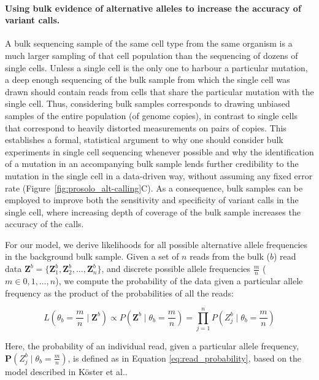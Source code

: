 \documentclass[12pt,inline]{wlscirep}
\newcommand{\Prob}{{\mathbf{P}}}
\begin{document}
\paragraph{Using bulk evidence of alternative alleles to increase the accuracy of variant calls.}
A bulk sequencing sample of the same cell type from the same organism is a much larger sampling of that cell population than the sequencing of dozens of single cells.
Unless a single cell is the only one to harbour a particular mutation, a deep enough sequencing of the bulk sample from which the single cell was drawn should contain reads from cells that share the particular mutation with the single cell.
Thus, considering bulk samples corresponds to drawing unbiased samples of the entire population (of genome copies), in contrast to single cells that correspond to heavily distorted measurements on pairs of copies.
This establishes a formal, statistical argument to why one should consider bulk experiments in single cell sequencing whenever possible and why the identification of a mutation in an accompanying bulk sample lends further credibility to the mutation in the single cell in a data-driven way, without assuming any fixed error rate (Figure~\ref{fig:prosolo_alt-calling}C).
As a consequence, bulk samples can be employed to improve both the sensitivity and specificity of variant calls in the single cell, where increasing depth of coverage of the bulk sample increases the accuracy of the calls. 

For our model, we derive likelihoods for all possible alternative allele frequencies in the background bulk sample.
Given a set of $n$ reads from the bulk ($b$) read data $\boldsymbol{Z}^b  = \{ \boldsymbol{Z}_1^b, \boldsymbol{Z}_2^b, \dots, \boldsymbol{Z}_n^b \}$, and discrete possible allele frequencies $\frac{m}{n}$ ($m \in 0, 1, \dots, n$), we compute the probability of the data given a particular allele frequency as the product of the probabilities of all the reads:

\begin{equation}
 \label{eq:bulk-prob}
 L\left(\theta_b = \frac{m}{n} \mid \boldsymbol{Z}^b\right) \propto
 P\left(\boldsymbol{Z}^b \mid \theta_b = \frac{m}{n}\right) =
 \prod_{j=1}^n P\left(Z_j^b \mid \theta_b = \frac{m}{n} \right)
\end{equation}

Here, the probability of an individual read, given a particular allele frequency, $\Prob(Z_j^b \mid \theta_b = \frac{m}{n})$, is defined as in Equation \ref{eq:read_probability}, based on the model described in Köster et al.\cite{koster_varlociraptor_2020}.
\end{document}
